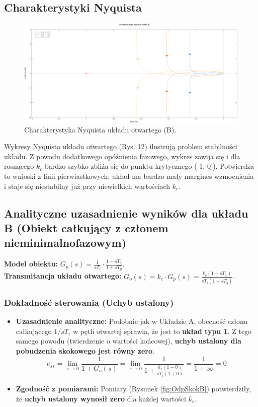\documentclass[12pt,a4paper]{article}
\begin{document}
	\subsection{Charakterystyki Nyquista}
	
	\begin{figure}[H]
		\centering
		\includegraphics[width=0.8\linewidth]{zdjecia/NQ_ukladB.png}
		\caption{Charakterystyka Nyquista układu otwartego (B).}
		\label{fig:NQ_ukladB}
	\end{figure}
	
	Wykresy Nyquista układu otwartego (Rys. 12) ilustrują problem stabilności układu. Z powodu dodatkowego opóźnienia fazowego, wykres zawija się i dla rosnącego $k_c$ bardzo szybko zbliża się do punktu krytycznego (-1, 0j). Potwierdza to wnioski z linii pierwiastkowych: układ ma bardzo mały margines wzmocnienia i staje się niestabilny już przy niewielkich wartościach $k_c$.
	
	\subsection{Analityczne uzasadnienie wyników dla układu B (Obiekt całkujący z członem nieminimalnofazowym)}
	
	\textbf{Model obiektu:} $G_p(s) = \frac{1}{sT_i} \cdot \frac{1 - sT_x}{1 + sT_y}$. \\
	\textbf{Transmitancja układu otwartego:} $G_o(s) = k_c \cdot G_p(s) = \frac{k_c (1 - sT_x)}{sT_i (1 + sT_y)}$.
	
	\subsubsection{Dokładność sterowania (Uchyb ustalony)}
	\begin{itemize}
		\item \textbf{Uzasadnienie analityczne:} Podobnie jak w Układzie A, obecność członu całkującego $1/sT_i$ w pętli otwartej sprawia, że jest to \textbf{układ typu 1}. Z tego samego powodu (twierdzenie o wartości końcowej), \textbf{uchyb ustalony dla pobudzenia skokowego jest równy zero}.
		\[
		e_{ss} = \lim_{s \to 0} \frac{1}{1 + G_o(s)} = \lim_{s \to 0} \frac{1}{1 + \frac{k_c(1 - 0)}{sT_i(1 + 0)}} = \frac{1}{1 + \infty} = 0
		\]
		\item \textbf{Zgodność z pomiarami:} Pomiary (Rysunek \ref{fig:OdpSkokB}) potwierdziły, że \textbf{uchyb ustalony wynosił zero} dla każdej wartości $k_c$.
	\end{itemize}
	
\end{document}
